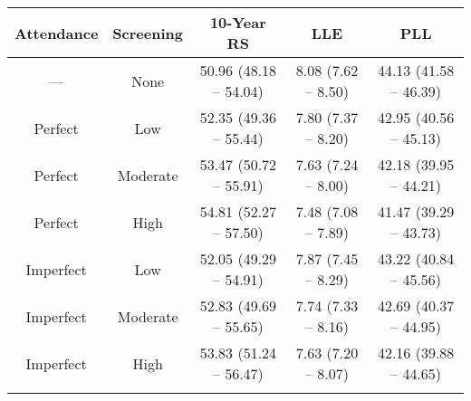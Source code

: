 \begin{tabular}{ccccc}
\toprule{}
Attendance & Screening & 10-Year RS & LLE & PLL   \\
\midrule{}
 --- & None &  50.96 (48.18 -- 54.04) & 8.08 (7.62 -- 8.50) & 44.13 (41.58 -- 46.39)  \\
Perfect & Low &  52.35 (49.36 -- 55.44) & 7.80 (7.37 -- 8.20) & 42.95 (40.56 -- 45.13)  \\
Perfect & Moderate &  53.47 (50.72 -- 55.91) & 7.63 (7.24 -- 8.00) & 42.18 (39.95 -- 44.21)  \\
Perfect & High &  54.81 (52.27 -- 57.50) & 7.48 (7.08 -- 7.89) & 41.47 (39.29 -- 43.73)  \\
Imperfect & Low &  52.05 (49.29 -- 54.91) & 7.87 (7.45 -- 8.29) & 43.22 (40.84 -- 45.56)  \\
Imperfect & Moderate &  52.83 (49.69 -- 55.65) & 7.74 (7.33 -- 8.16) & 42.69 (40.37 -- 44.95)  \\
Imperfect & High &  53.83 (51.24 -- 56.47) & 7.63 (7.20 -- 8.07) & 42.16 (39.88 -- 44.65)  \\
\bottomrule{}
\end{tabular}